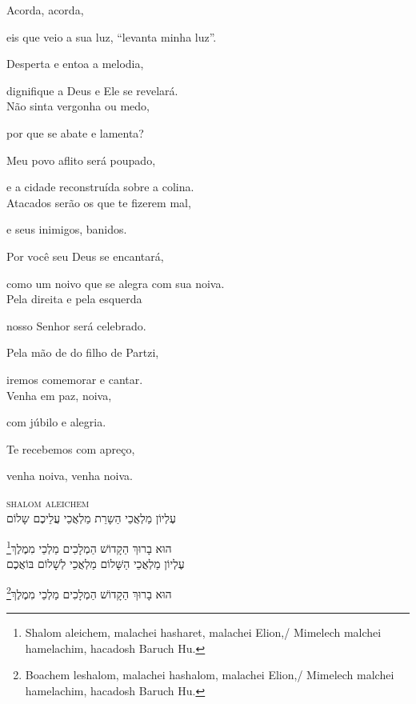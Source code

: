 Acorda, acorda,

eis que veio a sua luz, ``levanta minha luz''.

Desperta e entoa a melodia,

dignifique a Deus e Ele se revelará.\\[10pt]


Não sinta vergonha ou medo,

por que se abate e lamenta?

Meu povo aflito será poupado,

e a cidade reconstruída sobre a colina.\\[10pt]

Atacados serão os que te fizerem mal,

e seus inimigos, banidos.

Por você seu Deus se encantará,

como um noivo que se alegra com sua noiva.\\[10pt]

Pela direita e pela esquerda

nosso Senhor será celebrado.

Pela mão de do filho de Partzi,

iremos comemorar e cantar.\\[10pt]

Venha em paz, noiva,

com júbilo e alegria.

Te recebemos com apreço,

venha noiva, venha noiva.


\movetoevenpage
\raggedleft
{}

\vspace*{1cm}

\textsc{shalom aleichem}\\[15pt]

עֶלְיוֹן מַלְאֲכֵי הַשָרֵת מַלְאֲכֵי עֲלֵיכֶם שָלוֹם

\footnote{Shalom aleichem, malachei hasharet, malachei Elion,/ Mimelech malchei hamelachim, hacadosh Baruch Hu.}הוּא בָרוּךְ הַקָדוֹשׁ הַמְלָכִים מַלְכֵי מִמֶלֶךְ\\[10pt]

עֶלְיוֹן מַלְאֲכֵי הַשָּׁלוֹם מַלְאֲכֵי לְשָׁלוֹם בּוֹאֲכֶם

\footnote{Boachem leshalom, malachei hashalom, malachei Elion,/ Mimelech malchei hamelachim, hacadosh Baruch Hu.}הוּא בָרוּךְ הַקָדוֹשׁ הַמְלָכִים מַלְכֵי מִמֶלֶךְ\\[10pt]

